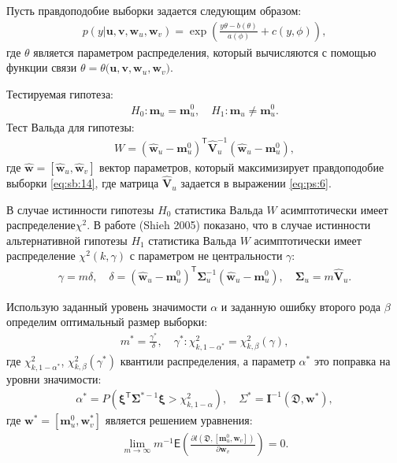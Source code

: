 Пусть правдоподобие выборки задается следующим образом:
\[
\label{eq:sb:14}
\begin{aligned}
	p(y|\textbf{u},\textbf{v},\textbf{w}_{u},\textbf{w}_{v}) = \exp\left(\frac{y\theta- b(\theta)}{a(\phi)} + c\left(y, \phi\right)\right),
\end{aligned}
\]
где $\theta$ является параметром распределения, который вычисляются с помощью функции связи $\theta=\theta\bigr(\textbf{u},\textbf{v},\textbf{w}_{u},\textbf{w}_{v}\bigr)$.

Тестируемая гипотеза:
\[
\label{eq:sb:15}
\begin{aligned}
	H_0: \textbf{m}_{u} = \textbf{m}_{u}^{0}, \quad H_1: \textbf{m}_{u} \not=\textbf{m}_{u}^{0}.
\end{aligned}
\]
Тест Вальда для гипотезы:
\[
\label{eq:sb:16}
\begin{aligned}
	W = \left(\hat{\textbf{w}}_{u} - \textbf{m}_{u}^{0}\right)^{\mathsf{T}}\hat{\textbf{V}}_{u}^{-1}\left(\hat{\textbf{w}}_{u} - \textbf{m}_{u}^{0}\right),
\end{aligned}
\]
где $\hat{\textbf{w}} = [\hat{\textbf{w}}_{u},\hat{\textbf{w}}_{v}]$ вектор параметров, который максимизирует правдоподобие выборки \eqref{eq:sb:14}, где матрица $\hat{\textbf{V}}_u$ задается в выражении \eqref{eq:ps:6}.

В случае истинности гипотезы $H_0$ статистика Вальда $W$ асимптотически имеет распределение$\chi^2$. В работе (Shieh 2005) показано, что в случае истинности альтернативной гипотезы $H_1$ статистика Вальда $W$ асимптотически имеет распределение $\chi^2(k,\gamma)$ с параметром не центральности $\gamma$:
\[
\label{eq:sb:17}
\begin{aligned}
	\gamma = m\delta, \quad \delta = \left(\hat{\textbf{w}}_{u} - \textbf{m}_{u}^{0}\right)^{\mathsf{T}}\bm{\Sigma}^{-1}_u\left(\hat{\textbf{w}}_{u} - \textbf{m}_{u}^{0}\right), \quad \bm{\Sigma}_u = m\hat{\textbf{V}}_u.
\end{aligned}
\]

Использую заданный уровень значимости $\alpha$ и заданную ошибку второго рода $\beta$ определим оптимальный размер выборки:
\[
\label{eq:sb:18}
\begin{aligned}
	m^* = \frac{\gamma^*}{\delta}, \quad \gamma^*:\chi^2_{k, 1-\alpha^{*}} = \chi^2_{k, \beta}\left(\gamma\right),
\end{aligned}
\]
где $\chi^2_{k, 1-\alpha^*}$, $\chi^2_{k, \beta}\left(\gamma^*\right)$ квантили распределения, а параметр $\alpha^*$ это поправка на уровни значимости:
\[
\label{eq:sb:19}
\begin{aligned}
	\alpha^* = P\left(\bm{\xi}^{\mathsf{T}}\bm{\Sigma}^{*-1} \bm{\xi} > \chi^2_{k,1 - \alpha}\right), \quad \Sigma^* = \textbf{I}^{-1}\left(\mathfrak{D}, \textbf{w}^*\right),
\end{aligned}
\]
где $\textbf{w}^{*} = \left[\textbf{m}_{u}^{0}, \textbf{w}^{*}_v\right]$ является решением уравнения:
\[
\label{eq:sb:20}
\begin{aligned}
	\lim_{m\to\infty}m^{-1}\mathsf{E}\left(\frac{\partial l\left(\mathfrak{D}, \left[ \textbf{m}_{u}^{0}, \textbf{w}_{v}\right]\right)}{\partial \textbf{w}_{v}}\right) = 0.
\end{aligned}
\]

